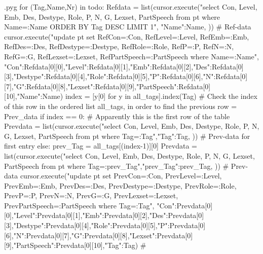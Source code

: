 \documentclass{report}
\makeatletter
\newenvironment{python}{%
  \VerbatimEnvironment
  \minted@resetoptions
  \setkeys{minted@opt}{}
      \begin{VerbatimOut}{\jobname.pyg}}
{%
      \end{VerbatimOut}
      \minted@pygmentize{python}
      \DeleteFile{\jobname.pyg}}
\makeatother
\begin{document}
\begin{python}
{{{for (Tag,Name,Nr) in todo:
    Refdata = list(cursor.execute("select Con, Level, Emb, Des, Destype, Role, P, N, G, Lexset, PartSpeech from pt where Name=:Name ORDER BY Tag DESC LIMIT 1", {"Name":Name, })) # Ref-data
    cursor.execute("update pt set RefCon=:Con, RefLevel=:Level, RefEmb=:Emb, RefDes=:Des, RefDestype=:Destype, RefRole=:Role, RefP=:P, RefN=:N, RefG=:G, RefLexset=:Lexset, RefPartSpeech=:PartSpeech where Name=:Name", {"Con":Refdata[0][0],"Level":Refdata[0][1],"Emb":Refdata[0][2],"Des":Refdata[0][3],"Destype":Refdata[0][4],"Role":Refdata[0][5],"P":Refdata[0][6],"N":Refdata[0][7],"G":Refdata[0][8],"Lexset":Refdata[0][9],"PartSpeech":Refdata[0][10],"Name":Name})
    index = [y[0] for y in all_tags].index(Tag)  # Check the index of this row in the ordered list all_tags, in order to find the previous row = Prev_data 
    if index == 0:  # Apparently this is the first row of the table
        Prevdata = list(cursor.execute("select Con, Level, Emb, Des, Destype, Role, P, N, G, Lexset, PartSpeech from pt where Tag=:Tag",{"Tag":Tag, })) # Prev-data for first entry
    else:
        prev_Tag = all_tags[(index-1)][0]
        Prevdata = list(cursor.execute("select Con, Level, Emb, Des, Destype, Role, P, N, G, Lexset, PartSpeech from pt where Tag=:prev_Tag",{"prev_Tag":prev_Tag, })) # Prev-data
    cursor.execute("update pt set PrevCon=:Con, PrevLevel=:Level, PrevEmb=:Emb, PrevDes=:Des, PrevDestype=:Destype, PrevRole=:Role, PrevP=:P, PrevN=:N, PrevG=:G, PrevLexset=:Lexset, PrevPartSpeech=:PartSpeech where Tag=:Tag", {"Con":Prevdata[0][0],"Level":Prevdata[0][1],"Emb":Prevdata[0][2],"Des":Prevdata[0][3],"Destype":Prevdata[0][4],"Role":Prevdata[0][5],"P":Prevdata[0][6],"N":Prevdata[0][7],"G":Prevdata[0][8],"Lexset":Prevdata[0][9],"PartSpeech":Prevdata[0][10],"Tag":Tag})
#}}}

\end{python}

\end{document}
